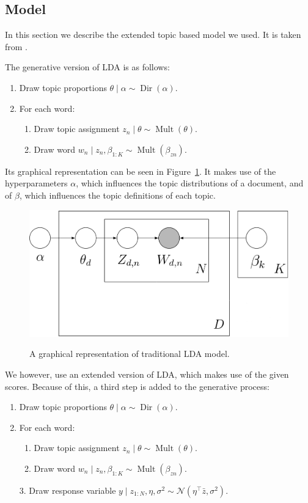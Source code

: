 \documentclass[a4paper,10pt]{article}
\DeclareMathOperator{\Dir}{Dir}
\DeclareMathOperator{\Mult}{Mult}
\begin{document}
\subsection{Model}
In this section we describe the extended topic based model we used.
It is taken from \cite{SLDA}.

The generative version of LDA is as follows:
\begin{enumerate}
  \item Draw topic proportions $\theta \mid \alpha \sim \Dir(\alpha)$.
  \item For each word:
  \begin{enumerate}
    \item Draw topic assignment $z_n \mid \theta \sim \Mult(\theta)$.
    \item Draw word $w_n \mid z_n, \beta_{1:K} \sim \Mult(\beta_{zn})$.
  \end{enumerate}
\end{enumerate}
Its graphical representation can be seen in Figure~\ref{fig:LDA}.
It makes use of the hyperparameters $\alpha$, which influences the topic distributions of a document, and of $\beta$, which influences the topic definitions of each topic.

\begin{figure}[ht!]
  \centering
  \includegraphics[width=\textwidth]{LDA.png}
  \label{fig:LDA}
  \caption{A graphical representation of traditional LDA model.}
\end{figure}

We however, use an extended version of LDA, which makes use of the given scores. 
Because of this, a third step is added to the generative process:

\begin{enumerate}
  \item Draw topic proportions $\theta \mid \alpha \sim \Dir(\alpha)$.
  \item For each word:
  \begin{enumerate}
    \item Draw topic assignment $z_n \mid \theta \sim \Mult(\theta)$.
    \item Draw word $w_n \mid z_n, \beta_{1:K} \sim \Mult(\beta_{zn})$.
  \end{enumerate}
  \item[3.] Draw response variable $y \mid z_{1:N}, \eta, \sigma^2 \sim \mathcal{N}(\eta^\top \bar{z}, \sigma^2)$.
\end{enumerate}
\end{document}
